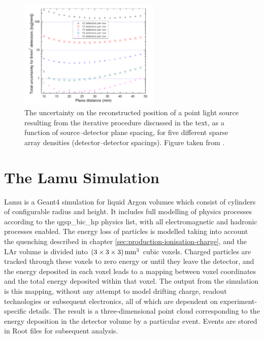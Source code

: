 \begin{figure}
\centering
\includegraphics[width=0.6\textwidth]{chapters/detectorphysics_images/detector-spacing}
\caption[Uncertainty on position resolution for several sparse array detector densities]{\label{fig:detector-spacing}The uncertainty on the reconstructed position of a point light source resulting from the iterative procedure discussed in the text, as a function of source--detector plane spacing, for five different sparse array densities (detector--detector spacings). Figure taken from \citep{Rutter2011}.}
\end{figure}

\section{The Lamu Simulation}\label{sec:lamu}
Lamu is a Geant4\citep{Geant4} simulation for liquid Argon volumes which consist of cylinders of configurable radius and height. It includes full modelling of physics processes according to the {\sc qgsp\_bic\_hp} physics list, with all electromagnetic and hadronic processes enabled. The energy loss of particles is modelled taking into account the quenching described in chapter \ref{sec:production-ionisation-charge}, and the \ac{LAr} volume is divided into $(3\times 3\times 3) \,\mathrm{mm}^3$ cubic voxels. Charged particles are tracked through these voxels to zero energy or until they leave the detector, and the energy deposited in each voxel leads to a mapping between voxel coordinates and the total energy deposited within that voxel. The output from the simulation is this mapping, without any attempt to model drifting charge, readout technologies or subsequent electronics, all of which are dependent on experiment-specific details. The result is a three-dimensional point cloud corresponding to the energy deposition in the detector volume by a particular event. Events are stored in {\sc Root} files for subsequent analysis.

